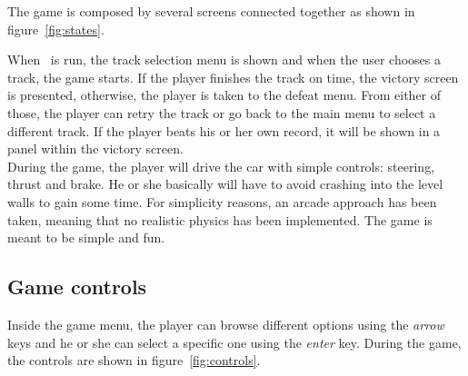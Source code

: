 The game is composed by several screens connected together as shown in
figure~\ref{fig:states}.\\


When \game\ is run, the track selection menu is shown and when the user chooses a track,
the game starts. If the player finishes the track on time, the victory screen is presented,
otherwise, the player is taken to the defeat menu. From either of those, the player
can retry the track or go back to the main menu to select a different track. If the player
beats his or her own record, it will be shown in a panel within the victory screen.\\

During the game, the player will drive the car with simple controls: steering, thrust
and brake. He or she basically will have to avoid crashing into the level walls to gain
some time. For simplicity reasons, an arcade approach has been taken, meaning that no
realistic physics has been implemented. The game is meant to be simple and fun.\\

\subsection{Game controls}

Inside the game menu, the player can browse different options using the \textit{arrow}
keys and he or she can select a specific one using the \textit{enter} key. During the
game, the controls are shown in figure~\ref{fig:controls}.

